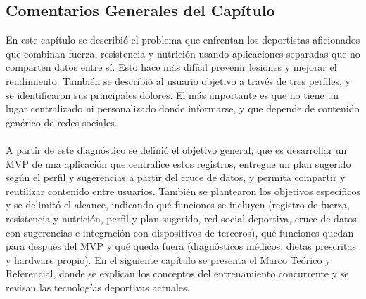 \subsection{Comentarios Generales del Capítulo}
En este capítulo se describió el problema que enfrentan los deportistas aficionados que combinan fuerza, resistencia y nutrición usando aplicaciones separadas que no comparten datos entre sí. Esto hace más difícil prevenir lesiones y mejorar el rendimiento. También se describió al usuario objetivo a través de tres perfiles, y se identificaron sus principales dolores. El más importante es que no tiene un lugar centralizado ni personalizado donde informarse, y que depende de contenido genérico de redes sociales.
\\\\
A partir de este diagnóstico se definió el objetivo general, que es desarrollar un MVP de una aplicación que centralice estos registros, entregue un plan sugerido según el perfil y sugerencias a partir del cruce de datos, y permita compartir y reutilizar contenido entre usuarios. También se plantearon los objetivos específicos y se delimitó el alcance, indicando qué funciones se incluyen (registro de fuerza, resistencia y nutrición, perfil y plan sugerido, red social deportiva, cruce de datos con sugerencias e integración con dispositivos de terceros), qué funciones quedan para después del MVP y qué queda fuera (diagnósticos médicos, dietas prescritas y hardware propio). En el siguiente capítulo se presenta el Marco Teórico y Referencial, donde se explican los conceptos del entrenamiento concurrente y se revisan las tecnologías deportivas actuales.
